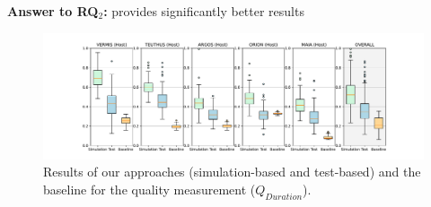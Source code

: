\textbf{Answer to RQ$_2$:} \simhotep{} provides significantly better results




\begin{figure}[tb]
    \centering
    \includegraphics[width=\textwidth]{Figures/Imhotep_with_legend_and_oracle_average-v4.pdf}
    \caption{Results of our \ApproachName{} approaches (simulation-based and test-based) and the baseline for the quality measurement ($Q_{Duration}$).}
    \label{fig:results}
\end{figure}